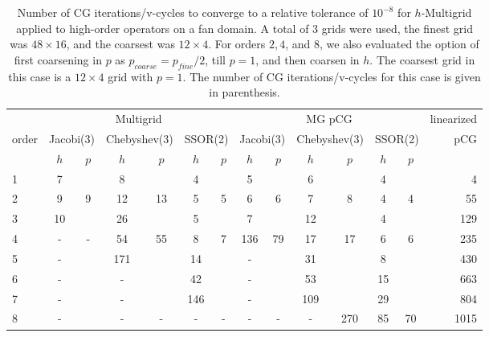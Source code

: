 \begin{table}
  \caption{\label{tab:fan} Number of CG iterations/v-cycles to converge to a relative tolerance of $10^{-8}$ for $h$-Multigrid applied to high-order operators on a fan domain. A total of 3 grids were used, the finest grid was $48\times 16$, and the coarsest was $12\times 4$. For orders $2,4$, and $8$, we also evaluated the option of first coarsening in $p$ as $p_{coarse} = p_{fine}/2$, till $p=1$, and then coarsen in $h$. The coarsest grid in this case is a $12\times 4$ grid with $p=1$. The number of CG iterations/v-cycles for this case is given in parenthesis.}
		\centering
    \begin{tabular}{|l|c|c|c|c|c|c|c|c|c|c|c|c|r|} 
\hline
		 & \multicolumn{6}{c|}{Multigrid} & \multicolumn{6}{c|}{MG pCG} &          linearized \\
		\cline{2-13}
		order &  \multicolumn{2}{c|}{\scriptsize  Jacobi(3)} &  \multicolumn{2}{c|}{\scriptsize Chebyshev(3)} & \multicolumn{2}{c|}{\scriptsize  SSOR(2)} & \multicolumn{2}{c|}{\scriptsize Jacobi(3)} &  \multicolumn{2}{c|}{\scriptsize Chebyshev(3)} & \multicolumn{2}{c|}{\scriptsize SSOR(2)} & pCG\\
				 \hline
				  & $h$ & $p$ & $h$ & $p$& $h$ & $p$& $h$ & $p$& $h$ & $p$& $h$ & $p$& \\
				  \cline{2-14}
         
 1 &       7 &       &         8 &       &       4 &       &         5 &        &         6 &      &             4 &     &  4  \\
 2 &       9 &   9   &        12 &  13   &       5 &   5   &         6 &   6    &         7 &  8   &             4 &  4  &  55  \\
 3 &      10 &       &        26 &       &       5 &       &         7 &        &        12 &      &             4 &     &  129  \\
 4 &       - &   -   &        54 &  55   &       8 &   7   &       136 &  79    &        17 & 17   &             6 &  6  &  235  \\
 5 &       - &       &       171 &       &      14 &       &         - &        &        31 &      &             8 &     &  430  \\
 6 &       - &       &         - &       &      42 &       &         - &        &        53 &      &            15 &     &  663  \\
 7 &       - &       &         - &       &     146 &       &         - &        &       109 &      &            29 &     &  804  \\
 8 &       - &       &         - &   -   &       - &   -   &         - &   -    &        -  & 270  &            85 & 70  &  1015  \\
\hline
	  \end{tabular}
\end{table}



